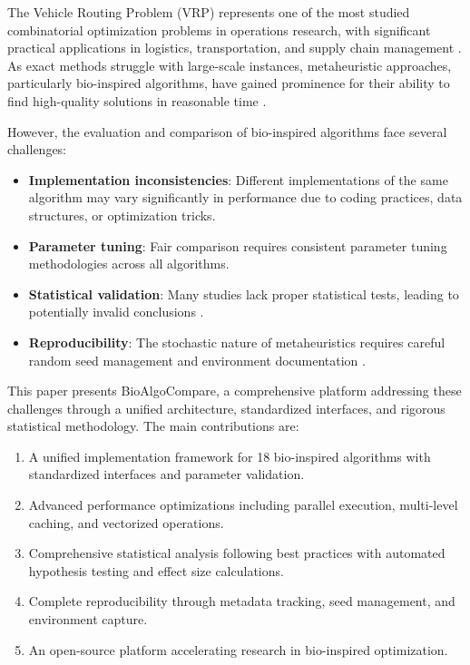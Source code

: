 \documentclass[conference]{IEEEtran}
\begin{document}
The Vehicle Routing Problem (VRP) represents one of the most studied combinatorial optimization problems in operations research, with significant practical applications in logistics, transportation, and supply chain management \cite{toth2014vehicle}. As exact methods struggle with large-scale instances, metaheuristic approaches, particularly bio-inspired algorithms, have gained prominence for their ability to find high-quality solutions in reasonable time \cite{osaba2020bio}.

However, the evaluation and comparison of bio-inspired algorithms face several challenges:

\begin{itemize}
    \item \textbf{Implementation inconsistencies}: Different implementations of the same algorithm may vary significantly in performance due to coding practices, data structures, or optimization tricks.
    \item \textbf{Parameter tuning}: Fair comparison requires consistent parameter tuning methodologies across all algorithms.
    \item \textbf{Statistical validation}: Many studies lack proper statistical tests, leading to potentially invalid conclusions \cite{garcia2010advanced}.
    \item \textbf{Reproducibility}: The stochastic nature of metaheuristics requires careful random seed management and environment documentation \cite{kendall2016good}.
\end{itemize}

This paper presents BioAlgoCompare, a comprehensive platform addressing these challenges through a unified architecture, standardized interfaces, and rigorous statistical methodology. The main contributions are:

\begin{enumerate}
    \item A unified implementation framework for 18 bio-inspired algorithms with standardized interfaces and parameter validation.
    \item Advanced performance optimizations including parallel execution, multi-level caching, and vectorized operations.
    \item Comprehensive statistical analysis following best practices with automated hypothesis testing and effect size calculations.
    \item Complete reproducibility through metadata tracking, seed management, and environment capture.
    \item An open-source platform accelerating research in bio-inspired optimization.
\end{enumerate}
\end{document}
